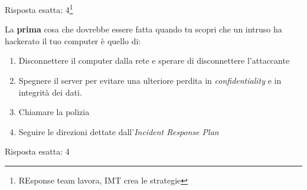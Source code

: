 \begin{Answer} [
  ref={esIRBC5},
  number={5}
  ]

  \Question Risposta esatta: 4\footnote{REsponse team lavora, IMT crea le
strategie}
\end{Answer}


\begin{Exercise} [
  title={Quiz},
  label={esIRBC6}
  ]

  \Question La \textbf{prima} cosa che dovrebbe essere fatta quando tu scopri
che un intruso ha hackerato il tuo computer \`e quello di:
\begin{enumerate}
 \item Disconnettere il computer dalla rete e sperare di disconnettere
l'attaccante
 \item Spegnere il server per evitare una ulteriore perdita in
\textit{confidentiality} e in integrit\`a dei dati.
 \item Chiamare la polizia
 \item Seguire le direzioni dettate dall'\textit{Incident Response Plan}
\end{enumerate}
\end{Exercise}

\begin{Answer} [
  ref={esIRBC6},
  number={6}
  ]

  \Question Risposta esatta: 4
\end{Answer}

